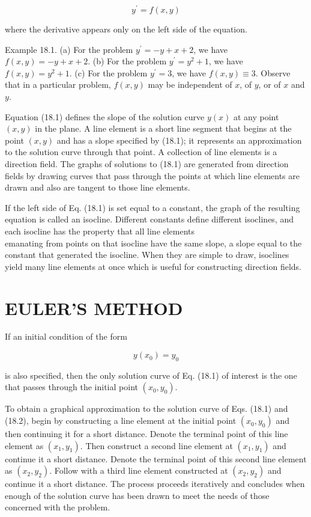 \documentclass[10pt]{article}
\begin{document}
\begin{equation*}
y^{\prime}=f(x, y) \tag{18.1}
\end{equation*}


where the derivative appears only on the left side of the equation.

Example 18.1. (a) For the problem $y^{\prime}=-y+x+2$, we have $f(x, y)=-y+x+2$. (b) For the problem $y^{\prime}=y^{2}+1$, we have $f(x, y)=y^{2}+1$. (c) For the problem $y^{\prime}=3$, we have $f(x, y) \equiv 3$. Observe that in a particular problem, $f(x, y)$ may be independent of $x$, of $y$, or of $x$ and $y$.

Equation (18.1) defines the slope of the solution curve $y(x)$ at any point $(x, y)$ in the plane. A line element is a short line segment that begins at the point $(x, y)$ and has a slope specified by (18.1); it represents an approximation to the solution curve through that point. A collection of line elements is a direction field. The graphs of solutions to (18.1) are generated from direction fields by drawing curves that pass through the points at which line elements are drawn and also are tangent to those line elements.

If the left side of Eq. (18.1) is set equal to a constant, the graph of the resulting equation is called an isocline. Different constants define different isoclines, and each isocline has the property that all line elements\\
emanating from points on that isocline have the same slope, a slope equal to the constant that generated the isocline. When they are simple to draw, isoclines yield many line elements at once which is useful for constructing direction fields.

\section*{EULER'S METHOD}
If an initial condition of the form


\begin{equation*}
y\left(x_{0}\right)=y_{0} \tag{18.2}
\end{equation*}


is also specified, then the only solution curve of Eq. (18.1) of interest is the one that passes through the initial point $\left(x_{0}, y_{0}\right)$.

To obtain a graphical approximation to the solution curve of Eqs. (18.1) and (18.2), begin by constructing a line element at the initial point $\left(x_{0}, y_{0}\right)$ and then continuing it for a short distance. Denote the terminal point of this line element as $\left(x_{1}, y_{1}\right)$. Then construct a second line element at $\left(x_{1}, y_{1}\right)$ and continue it a short distance. Denote the terminal point of this second line element as $\left(x_{2}, y_{2}\right)$. Follow with a third line element constructed at $\left(x_{2}, y_{2}\right)$ and continue it a short distance. The process proceeds iteratively and concludes when enough of the solution curve has been drawn to meet the needs of those concerned with the problem.
\end{document}
